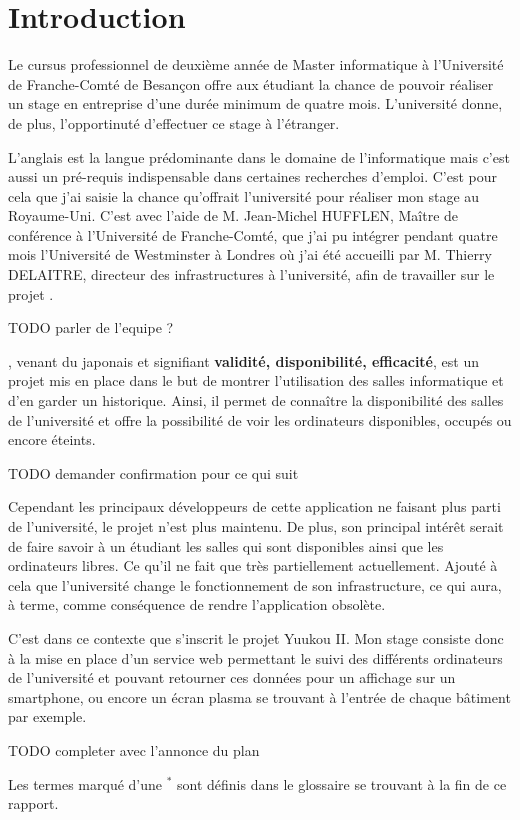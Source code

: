 \chapter{Introduction}

Le cursus professionnel de deuxi\`eme ann\'ee de Master informatique \`a l'Universit\'e de Franche-Comt\'e de Besan\c{c}on offre aux \'etudiant la chance de pouvoir r\'ealiser un stage en entreprise d'une dur\'ee minimum de quatre mois. 
L'universit\'e donne, de plus, l'opportinut\'e d'effectuer ce stage \`a l'\'etranger.

L'anglais est la langue pr\'edominante dans le domaine de l'informatique mais c'est aussi un pr\'e-requis indispensable dans certaines recherches d'emploi.
C'est pour cela que j'ai saisie la chance qu'offrait l'universit\'e pour r\'ealiser mon stage au Royaume-Uni. 
C'est avec l'aide de M. Jean-Michel HUFFLEN, Ma\^itre de conf\'erence \`a l'Universit\'e de Franche-Comt\'e, que j'ai pu int\'egrer pendant quatre mois l'Universit\'e de Westminster \`a Londres o\`u j'ai \'et\'e accueilli par M. Thierry DELAITRE, directeur des infrastructures \`a l'universit\'e, afin de travailler sur le projet \YuukouII.

TODO parler de l'equipe ?

\Yuukou, venant du japonais et signifiant \textbf{validit\'e, disponibilit\'e, efficacit\'e}, est un projet mis en place dans le but de montrer l'utilisation des salles informatique et d'en garder un historique.
Ainsi, il permet de conna\^itre la disponibilit\'e des salles de l'universit\'e et offre la possibilit\'e de voir les ordinateurs disponibles, occup\'es ou encore \'eteints.

TODO demander confirmation pour ce qui suit

Cependant les principaux d\'eveloppeurs de cette application ne faisant plus parti de l'universit\'e, le projet n'est plus maintenu.
De plus, son principal int\'er\^et serait de faire savoir \`a un \'etudiant les salles qui sont disponibles ainsi que les ordinateurs libres.
Ce qu'il ne fait que tr\`es partiellement actuellement.
Ajout\'e \`a cela que l'universit\'e change le fonctionnement de son infrastructure, ce qui aura, \`a terme, comme cons\'equence de rendre l'application obsol\`ete.

C'est dans ce contexte que s'inscrit le projet Yuukou II. 
Mon stage consiste donc \`a la mise en place d'un service web permettant le suivi des diff\'erents ordinateurs de l'universit\'e et pouvant retourner ces donn\'ees pour un affichage sur un smartphone, ou encore un \'ecran plasma se trouvant \`a l'entr\'ee de chaque b\^atiment par exemple.

 TODO completer avec l'annonce du plan

\vspace{1.5cm}

\noindent Les termes marqu\'e d'une $^*$ sont d\'efinis dans le glossaire se trouvant \`a la fin de ce rapport.

\clearpage
